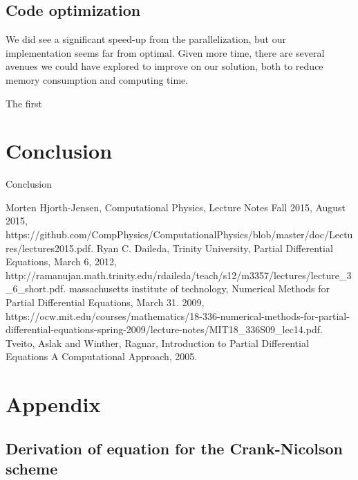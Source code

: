 \documentclass[reprint, english,notitlepage,nofootinbib]{revtex4-1}  %
\begin{document}
\subsection*{Code optimization}

We did see a significant speed-up from the parallelization, but our implementation seems far from optimal. Given more time, there are several avenues we could have explored to improve on our solution, both to reduce memory consumption and computing time.

The first



\section{Conclusion}

Conclusion


\onecolumngrid
\vspace{1cm} %

\begin{thebibliography}{}
 Morten Hjorth-Jensen, Computational Physics, Lecture Notes Fall 2015, August 2015, https://github.com/CompPhysics/ComputationalPhysics/blob/master/doc/Lectures/lectures2015.pdf.
 Ryan C. Daileda, Trinity University, Partial Differential Equations, March 6, 2012, http://ramanujan.math.trinity.edu/rdaileda/teach/s12/m3357/lectures/lecture\_3\_6\_short.pdf.
 massachusetts institute of technology, Numerical Methods for Partial Differential Equations, March 31. 2009, https://ocw.mit.edu/courses/mathematics/18-336-numerical-methods-for-partial-differential-equations-spring-2009/lecture-notes/MIT18\_336S09\_lec14.pdf.
 Tveito, Aslak and Winther, Ragnar, Introduction to Partial Differential Equations A Computational Approach, 2005.

\end{thebibliography}


\section{Appendix}

\subsection{Derivation of equation for the Crank-Nicolson scheme} \label{sect:Crank-Nicolson_derivation}
\end{document}
